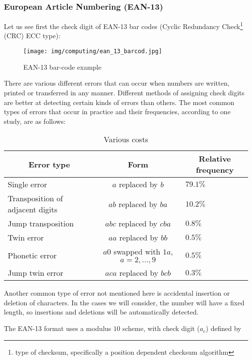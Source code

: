 	\subsubsection{European Article Numbering (EAN-13)}
	Let us see first the check digit of EAN-13 bar codes (Cyclic Redundancy Check\footnote{type of checksum, specifically a position dependent checksum algorithm} (CRC) ECC type):
	\begin{figure}[H]
		\centering
		\texttt{[image: img/computing/ean\_13\_barcod.jpg]}
		\caption{EAN-13 bar-code example}
	\end{figure}
	There are various different errors that can occur when numbers are written, printed or transferred in any manner. Different methods of assigning check digits are better at detecting certain kinds of errors than others. The most common types of errors that occur in practice and their frequencies, according to one study, are as follows:
	\begin{table}[H]
	\begin{center}
			\begin{tabular}{|l|c|l|}
				\hline
				\multicolumn{1}{c}{\cellcolor{black!30}\textbf{Error type}} & 
  \multicolumn{1}{c}{\cellcolor{black!30}\textbf{Form}} & 
  \multicolumn{1}{c}{\cellcolor{black!30}\textbf{Relative frequency}} \\ \hline
				 Single error & $a$ replaced by $b$ & $79.1\%$ \\ \hline
				 Transposition of adjacent digits & $ab$ replaced by $ba$ & $10.2\%$ \\ \hline
				 Jump transposition & $abc$ replaced by $cba$ & $0.8\%$ \\ \hline
				 Twin error & $aa$ replaced by $bb$ & $0.5\%$\\ \hline
				 Phonetic error & $a0$ swapped with $1a$, $a = 2,\ldots,9$ & $0.5\%$ \\ \hline
				 Jump twin error & $aca$ replaced by $bcb$ & $0.3\%$ \\ \hline
		\end{tabular}
	\end{center}
	\caption[]{Various costs}
	\end{table}
	Another common type of error not mentioned here is accidental insertion or deletion of characters. In the cases we will consider, the number will have a fixed length, so insertions and deletions will be automatically detected.
	
	The EAN-13 format uses a modulus $10$ scheme, with check digit ($a_ c$) defined by
	

